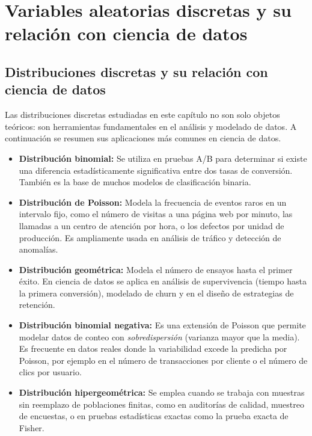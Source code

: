 \section{Variables aleatorias discretas y su relación con ciencia de datos}
\subsection{Distribuciones discretas y su relación con ciencia de datos}

Las distribuciones discretas estudiadas en este capítulo no son solo objetos teóricos: son herramientas fundamentales en el análisis y modelado de datos. A continuación se resumen sus aplicaciones más comunes en ciencia de datos.

\begin{itemize}
 \item \textbf{Distribución binomial:} Se utiliza en pruebas A/B para determinar si existe una diferencia estadísticamente significativa entre dos tasas de conversión. También es la base de muchos modelos de clasificación binaria.

 \item \textbf{Distribución de Poisson:} Modela la frecuencia de eventos raros en un intervalo fijo, como el número de visitas a una página web por minuto, las llamadas a un centro de atención por hora, o los defectos por unidad de producción. Es ampliamente usada en análisis de tráfico y detección de anomalías.

 \item \textbf{Distribución geométrica:} Modela el número de ensayos hasta el primer éxito. En ciencia de datos se aplica en análisis de supervivencia (tiempo hasta la primera conversión), modelado de churn y en el diseño de estrategias de retención.

 \item \textbf{Distribución binomial negativa:} Es una extensión de Poisson que permite modelar datos de conteo con \emph{sobredispersión} (varianza mayor que la media). Es frecuente en datos reales donde la variabilidad excede la predicha por Poisson, por ejemplo en el número de transacciones por cliente o el número de clics por usuario.

 \item \textbf{Distribución hipergeométrica:} Se emplea cuando se trabaja con muestras sin reemplazo de poblaciones finitas, como en auditorías de calidad, muestreo de encuestas, o en pruebas estadísticas exactas como la prueba exacta de Fisher.
\end{itemize}

